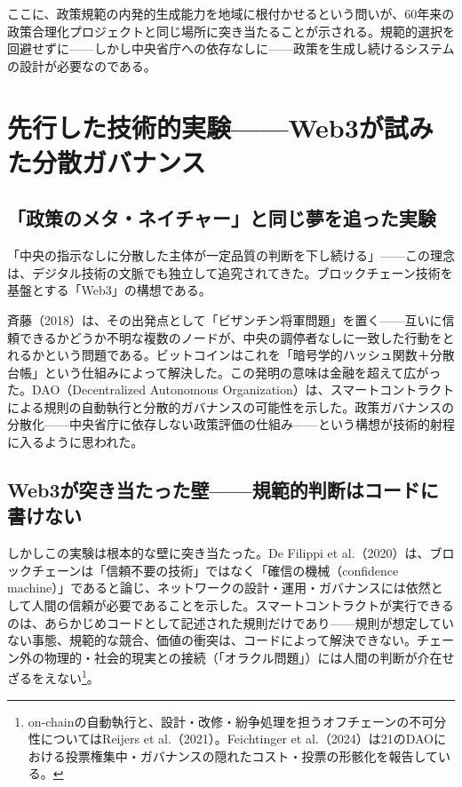 ここに、政策規範の内発的生成能力を地域に根付かせるという問いが、60年来の政策合理化プロジェクトと同じ場所に突き当たることが示される。規範的選択を回避せずに——しかし中央省庁への依存なしに——政策を生成し続けるシステムの設計が必要なのである。

\section{先行した技術的実験——Web3が試みた分散ガバナンス}
\label{sec:intro_web3}

\subsection{「政策のメタ・ネイチャー」と同じ夢を追った実験}
\label{subsec:intro_web3_attempt}

「中央の指示なしに分散した主体が一定品質の判断を下し続ける」——この理念は、デジタル技術の文脈でも独立して追究されてきた。ブロックチェーン技術を基盤とする「Web3」の構想である。

斉藤（2018）は、その出発点として「ビザンチン将軍問題」を置く\cite{saito2018trust}——互いに信頼できるかどうか不明な複数のノードが、中央の調停者なしに一致した行動をとれるかという問題である。ビットコインはこれを「暗号学的ハッシュ関数＋分散台帳」という仕組みによって解決した。この発明の意味は金融を超えて広がった。DAO（Decentralized Autonomous Organization）は、スマートコントラクトによる規則の自動執行と分散的ガバナンスの可能性を示した\cite{hassan2021dao,hsieh2018dao}。政策ガバナンスの分散化——中央省庁に依存しない政策評価の仕組み——という構想が技術的射程に入るように思われた\cite{olnes2017blockchain}。

\subsection{Web3が突き当たった壁——規範的判断はコードに書けない}
\label{subsec:intro_web3_wall}

しかしこの実験は根本的な壁に突き当たった。De Filippi et al.（2020）は、ブロックチェーンは「信頼不要の技術」ではなく「確信の機械（confidence machine）」であると論じ、ネットワークの設計・運用・ガバナンスには依然として人間の信頼が必要であることを示した\cite{defilippi2020confidence}。スマートコントラクトが実行できるのは、あらかじめコードとして記述された規則だけであり——規則が想定していない事態、規範的な競合、価値の衝突は、コードによって解決できない。チェーン外の物理的・社会的現実との接続（「オラクル問題」）には人間の判断が介在せざるをえない\cite{janssen2020blockchain,reijers2018governance}\footnote{on-chainの自動執行と、設計・改修・紛争処理を担うオフチェーンの不可分性についてはReijers et al.（2021）\cite{reijers2018governance}。Feichtinger et al.（2024）は21のDAOにおける投票権集中・ガバナンスの隠れたコスト・投票の形骸化を報告している\cite{fritsch2024dao}。}。

